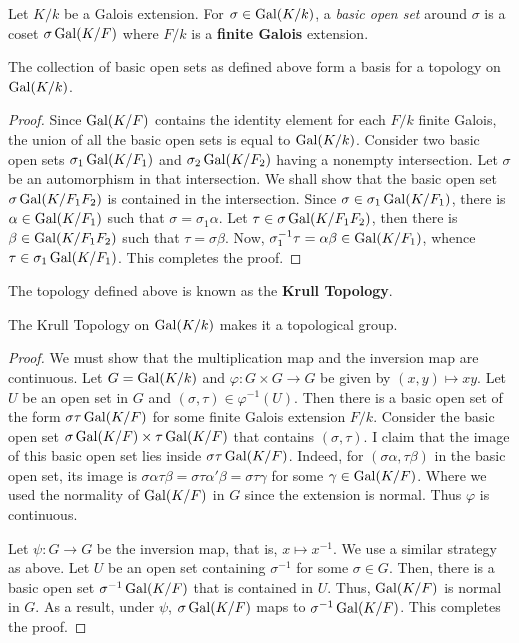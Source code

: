 \begin{definition}
    Let $K/k$ be a Galois extension. For $\sigma\in\operatorname{Gal}(K/k)$, a \textit{basic open set} around $\sigma$ is a coset $\sigma\operatorname{Gal}(K/F)$ where $F/k$ is a \textbf{finite Galois} extension.
\end{definition}

\begin{proposition}
    The collection of basic open sets as defined above form a basis for a topology on $\operatorname{Gal}(K/k)$.
\end{proposition}
\begin{proof}
    Since $\operatorname{Gal}(K/F)$ contains the identity element for each $F/k$ finite Galois, the union of all the basic open sets is equal to $\operatorname{Gal}(K/k)$. Consider two basic open sets $\sigma_1\operatorname{Gal}(K/F_1)$ and $\sigma_2\operatorname{Gal}(K/F_2)$ having a nonempty intersection. Let $\sigma$ be an automorphism in that intersection. We shall show that the basic open set $\sigma\operatorname{Gal}(K/F_1F_2)$ is contained in the intersection. Since $\sigma\in\sigma_1\operatorname{Gal}(K/F_1)$, there is $\alpha\in\operatorname{Gal}(K/F_1)$ such that $\sigma = \sigma_1\alpha$. Let $\tau\in\sigma\operatorname{Gal}(K/F_1F_2)$, then there is $\beta\in\operatorname{Gal}(K/F_1F_2)$ such that $\tau = \sigma\beta$. Now, $\sigma_1^{-1}\tau = \alpha\beta\in\operatorname{Gal}(K/F_1)$, whence $\tau\in\sigma_1\operatorname{Gal}(K/F_1)$. This completes the proof.
\end{proof}

The topology defined above is known as the \textbf{Krull Topology}.

\begin{theorem}
    The Krull Topology on $\operatorname{Gal}(K/k)$ makes it a topological group.
\end{theorem}
\begin{proof}
    We must show that the multiplication map and the inversion map are continuous. Let $G = \operatorname{Gal}(K/k)$ and $\varphi: G\times G\to G$ be given by $(x,y)\mapsto xy$. Let $U$ be an open set in $G$ and $(\sigma,\tau)\in\varphi^{-1}(U)$. Then there is a basic open set of the form $\sigma\tau\operatorname{Gal}(K/F)$ for some finite Galois extension $F/k$. Consider the basic open set $\sigma\operatorname{Gal}(K/F)\times\tau\operatorname{Gal}(K/F)$ that contains $(\sigma,\tau)$. I claim that the image of this basic open set lies inside $\sigma\tau\operatorname{Gal}(K/F)$. Indeed, for $(\sigma\alpha,\tau\beta)$ in the basic open set, its image is $\sigma\alpha\tau\beta = \sigma\tau\alpha'\beta = \sigma\tau\gamma$ for some $\gamma\in\operatorname{Gal}(K/F)$. Where we used the normality of $\operatorname{Gal}(K/F)$ in $G$ since the extension is normal. Thus $\varphi$ is continuous.

    Let $\psi: G\to G$ be the inversion map, that is, $x\mapsto x^{-1}$. We use a similar strategy as above. Let $U$ be an open set containing $\sigma^{-1}$ for some $\sigma\in G$. Then, there is a basic open set $\sigma^{-1}\operatorname{Gal}(K/F)$ that is contained in $U$. Thus, $\operatorname{Gal}(K/F)$ is normal in $G$. As a result, under $\psi$, $\sigma\operatorname{Gal}(K/F)$ maps to $\sigma^{-1}\operatorname{Gal}(K/F)$. This completes the proof.
\end{proof}

